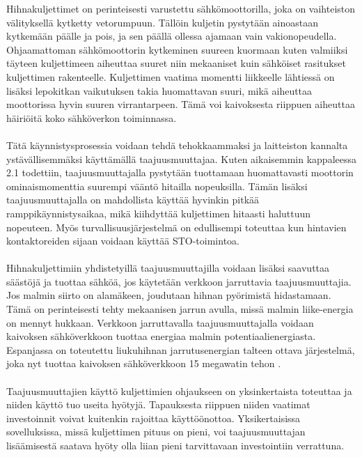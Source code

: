 \documentclass[finnish,12pt,a4paper,pdftex,elec,utf8]{aaltothesis}
\begin{document}
\noindent
Hihnakuljettimet on perinteisesti varustettu sähkömoottorilla, joka on vaihteiston välityksellä kytketty vetorumpuun. Tällöin kuljetin pystytään ainoastaan kytkemään päälle ja pois, ja sen päällä ollessa ajamaan vain vakionopeudella. Ohjaamattoman sähkömoottorin kytkeminen suureen kuormaan kuten valmiiksi täyteen kuljettimeen aiheuttaa suuret niin mekaaniset kuin sähköiset rasitukset kuljettimen rakenteelle. Kuljettimen vaatima momentti liikkeelle lähtiessä on lisäksi lepokitkan vaikutuksen takia huomattavan suuri, mikä aiheuttaa moottorissa hyvin suuren virrantarpeen. Tämä voi kaivoksesta riippuen aiheuttaa häiriöitä koko sähköverkon toiminnassa.\cite{MyyntiHaastattelu}
\\\\
Tätä käynnistysprosessia voidaan tehdä tehokkaammaksi ja laitteiston kannalta ystävällisemmäksi käyttämällä taajuusmuuttajaa. Kuten aikaisemmin kappaleessa 2.1 todettiin, taajuusmuuttajalla pystytään tuottamaan huomattavasti moottorin ominaismomenttia suurempi vääntö hitailla nopeuksilla. Tämän lisäksi taajuusmuuttajalla on mahdollista käyttää hyvinkin pitkää ramppikäynnistysaikaa, mikä kiihdyttää kuljettimen hitaasti haluttuun nopeuteen. Myös turvallisuusjärjestelmä on edullisempi toteuttaa kun hintavien kontaktoreiden sijaan voidaan käyttää STO-toimintoa. 
\\\\
Hihnakuljettimiin yhdistetyillä taajuusmuuttajilla voidaan lisäksi saavuttaa säästöjä ja tuottaa sähköä, jos käytetään verkkoon jarruttavia taajuusmuuttajia. Jos malmin siirto on alamäkeen, joudutaan hihnan pyörimistä hidastamaan. Tämä on perinteisesti tehty mekaanisen jarrun avulla, missä malmin liike-energia on mennyt hukkaan. Verkkoon jarruttavalla taajuusmuuttajalla voidaan kaivoksen sähköverkkoon tuottaa energiaa malmin potentiaalienergiasta. Espanjassa on toteutettu liukuhihnan jarrutusenergian talteen ottava järjestelmä, joka nyt tuottaa kaivoksen sähköverkkoon 15 megawatin tehon \cite{Rodriguez}.
\\\\
Taajuusmuuttajien käyttö kuljettimien ohjaukseen on yksinkertaista toteuttaa ja  niiden käyttö tuo useita hyötyjä. Tapauksesta riippuen niiden vaatimat investoinnit voivat kuitenkin rajoittaa käyttöönottoa. Yksikertaisissa sovelluksissa, missä kuljettimen pituus on pieni, voi taajuusmuuttajan lisäämisestä saatava hyöty olla liian pieni tarvittavaan investointiin verrattuna. 


\end{document}
